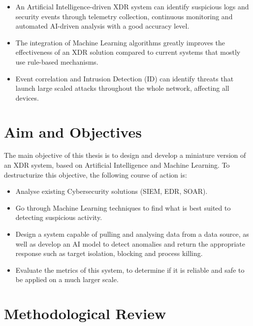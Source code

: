 \documentclass[12pt,a4paper]{report}
\begin{document}
\begin{itemize}
  \item[\textbf{H1:}] An Artificial Intelligence-driven XDR system can identify suspicious logs
  and security events through telemetry collection, continuous monitoring and automated
  AI-driven analysis with a good accuracy level.

  \item[\textbf{H2:}] The integration of Machine Learning algorithms greatly improves the
  effectiveness of an XDR solution compared to current systems that mostly use rule-based
  mechanisms.

  \item[\textbf{H3:}] Event correlation and Intrusion Detection (ID) can identify threats that
  launch large scaled attacks throughout the whole network, affecting all devices.
\end{itemize}

\section{Aim and Objectives}

The main objective of this thesis is to design and develop a miniature version of an XDR system,
based on Artificial Intelligence and Machine Learning. To destructurize this objective, the
following course of action is:

\begin{itemize}
  \item Analyse existing Cybersecurity solutions (SIEM, EDR, SOAR).
  \item Go through Machine Learning techniques to find what is best suited to detecting
  suspicious activity.
  \item Design a system capable of pulling and analysing data from a data source, as well as
  develop an AI model to detect anomalies and return the appropriate response such as target
  isolation, blocking and process killing.
  \item Evaluate the metrics of this system, to determine if it is reliable and safe to be
  applied on a much larger scale.
\end{itemize}

\section{Methodological Review}
\end{document}
